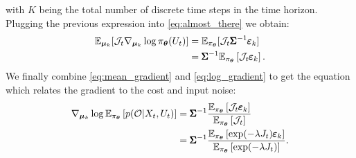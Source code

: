 with $K$ being the total number of discrete time steps in the time horizon. 
Plugging the previous expression into \eqref{eq:almost_there} we obtain:
\begin{align}
    \mathbb{E}_{\boldsymbol{\mu}_k} [\mathcal{J}_t \nabla_{\boldsymbol{\mu}_k} \log \pi_{\boldsymbol{\theta}}(U_t)]
    &= \mathbb{E}_{\pi_{\boldsymbol{\theta}}} [\mathcal{J}_t \pmb{\Sigma}^{-1} \pmb{\varepsilon}_k] \\
    &= \pmb{\Sigma}^{-1} \mathbb{E}_{\pi_{\boldsymbol{\theta}}} \left [\mathcal{J}_t \pmb{\varepsilon}_k\right]. \label{eq:mean_gradient}
\end{align}
We finally combine \eqref{eq:mean_gradient} and \eqref{eq:log_gradient} to get the equation which relates the gradient to the cost and input noise:
\begin{align}
     \nabla_{\boldsymbol{\mu}_k} \log \mathbb{E}_{\pi_{\boldsymbol{\theta}}} \left [p(\mathcal{O} | X_t, U_t)\right] 
     &= \pmb{\Sigma}^{-1} \frac{\mathbb{E}_{\pi_{\boldsymbol{\theta}}} \left [\mathcal{J}_t \pmb{\varepsilon}_k\right]}{\mathbb{E}_{\pi_{\boldsymbol{\theta}}} \left [\mathcal{J}_t\right]} \\
     &= \pmb{\Sigma}^{-1} \frac{\mathbb{E}_{\pi_{\boldsymbol{\theta}}} \left [\exp(-\lambda J_t) \pmb{\varepsilon}_k\right]}{\mathbb{E}_{\pi_{\boldsymbol{\theta}}} \left [\exp(-\lambda J_t)\right]}.
\end{align}

